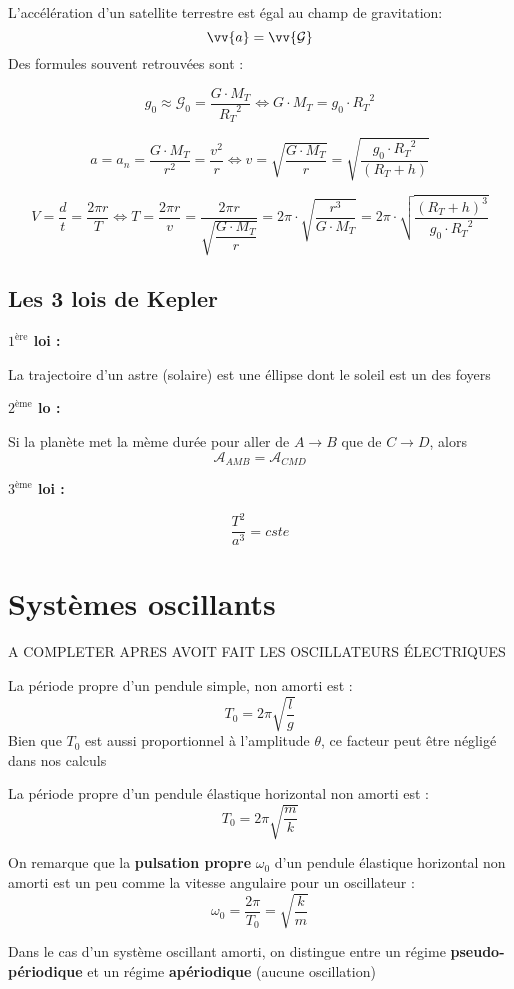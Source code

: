 \documentclass[main.tex]{subfiles}
\begin{document}
\begin{Definition}
    L'accélération d'un satellite terrestre est égal au champ de gravitation:
    $$\vv{a}=\vv{\mathcal{G}}$$
    Des formules souvent retrouvées sont :

    $$g_{0}\approx\mathcal{G}_{0}=\dfrac{G\cdot M_{T}}{{R_{T}}^2} \Leftrightarrow G\cdot M_{T} = g_{0}\cdot {R_{T}}^2$$

    $$a=a_{n}=\dfrac{G\cdot M_{T}}{r^2} = \dfrac{v^2}{r} \Leftrightarrow v=\sqrt{\dfrac{G\cdot M_{T}}{r}} = \sqrt{\dfrac{g_{0}\cdot{R_{T}}^2}{(R_{T} + h) }}$$

    $$V=\dfrac{d}{t}=\dfrac{2\pi r}{T} \Leftrightarrow T = \dfrac{2\pi r}{v} = \dfrac{2\pi r}{\sqrt{\dfrac{G\cdot M_{T}}{r}}} = 2\pi\cdot\sqrt{\dfrac{r^3}{G\cdot M_{T}}} = 2\pi\cdot\sqrt{\dfrac{(R_{T} + h)^3}{g_{0} \cdot {R_{T}}^2}} $$
\end{Definition}


\subsection{Les 3 lois de Kepler}

\begin{Definition}
    \textbf{$1^{\text{ère}}$ loi :}

    La trajectoire d'un astre (solaire) est une éllipse dont le soleil est un des foyers

    \textbf{$2^{\text{ème}}$ lo :}

    Si la planète met la mème durée pour aller de $A \to B$ que de $C \to D$, alors 
    $$\mathcal{A}_{AMB} = \mathcal{A}_{CMD}$$

    \textbf{$3^{\text{ème}}$ loi :}

    $$\dfrac{T^2}{a^3}=cste$$
\end{Definition}



\section{Systèmes oscillants}

\begin{Definition}
    A COMPLETER APRES AVOIT FAIT LES OSCILLATEURS ÉLECTRIQUES

    La période propre d'un pendule simple, non amorti est :
    $$T_{0}=2\pi\sqrt{\dfrac{l}{g}}$$
    Bien que $T_{0}$ est aussi proportionnel à l'amplitude $\theta$, ce facteur peut être négligé dans nos calculs

    La période propre d'un pendule élastique horizontal non amorti est :
    $$T_{0}=2\pi\sqrt{\dfrac{m}{k}}$$

    On remarque que la \textbf{pulsation propre} $\omega_{0}$ d'un pendule élastique horizontal non amorti est un peu comme la vitesse angulaire pour un oscillateur :
    $$\omega_{0}=\dfrac{2\pi}{T_{0}}=\sqrt{\dfrac{k}{m}}$$

    Dans le cas d'un système oscillant amorti, on distingue entre un régime \textbf{pseudo-périodique} et un régime \textbf{apériodique} (aucune oscillation)
\end{Definition}
\end{document}
